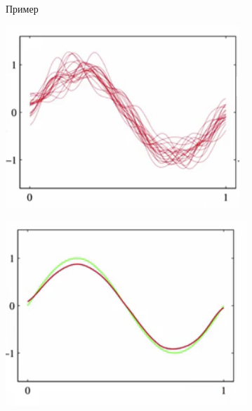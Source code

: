 \documentclass[10pt]{beamer}
\begin{document}
\begin{frame}{Пример}
  \centering
  \begin{minipage}[b]{.45\textwidth}
    \includegraphics[width=\textwidth, keepaspectratio]{images/example2} 
  \end{minipage}\qquad
  \begin{minipage}[b]{.45\textwidth}
    \includegraphics[width=\textwidth, keepaspectratio]{images/example1}
  \end{minipage}
\end{frame}
\end{document}
